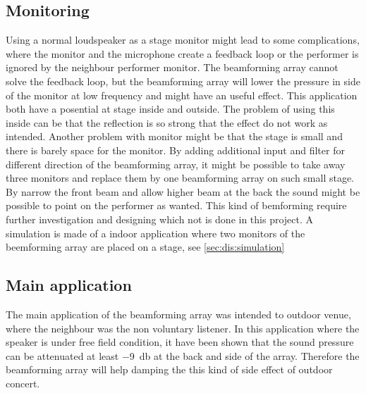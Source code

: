 \subsection{Monitoring}
Using a normal loudspeaker as a stage monitor might lead to some complications, where the monitor and the microphone create a feedback loop or the performer is ignored by the neighbour performer monitor. The beamforming array cannot solve the feedback loop, but the beamforming array will lower the pressure in side of the monitor at low frequency and might have an useful effect. This application both have a posential at stage inside and outside. The problem of using this inside can be that the reflection is so strong that the effect do not work as intended. Another problem with monitor might be that the stage is small and there is barely space for the monitor. By adding additional input and filter for different direction of the beamforming array, it might be possible to take away three monitors and replace them by one beamforming array on such small stage. By narrow the front beam and allow higher beam at the back the sound might be possible to point on the performer as wanted. This kind of bemforming require further investigation and designing which not is done in this project. A simulation is made of a indoor application where two monitors of the beemforming array are placed on a stage, see \autoref{sec:dis:simulation}



\subsection{Main application}
The main application of the beamforming array was intended to outdoor venue, where the neighbour was the non voluntary listener. In this application where the speaker is under free field condition, it have been shown that the sound pressure can be attenuated at least \SI{-9}{\decibel} at the back and side of the array. Therefore the beamforming array will help damping the this kind of side effect of outdoor concert.



